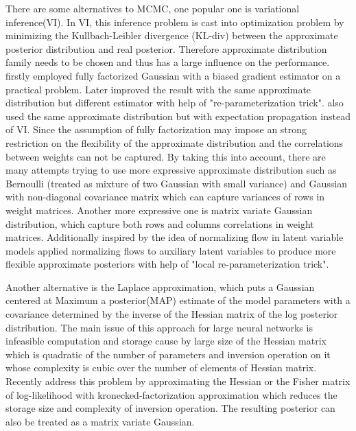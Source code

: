 There are some alternatives to MCMC, one popular one is variational inference(VI)\cite{hinton1993keeping}. In VI, this inference problem is cast into optimization problem by minimizing the Kullbach-Leibler divergence (KL-div) between the approximate posterior distribution and real posterior. Therefore approximate distribution family needs to be chosen and thus has a large influence on the performance. \cite{graves2011practical} firstly employed fully factorized Gaussian with a biased gradient estimator on a practical problem. Later \cite{blundell2015weight} improved the result with the same approximate distribution but different estimator with help of "re-parameterization trick"\cite{kingma2013auto}. \citealp{hernandez2015probabilistic} also used the same approximate distribution but with expectation propagation\cite{minka2001expectation} instead of VI.
Since the assumption of fully factorization may impose an strong restriction on the flexibility of the approximate distribution and the correlations between weights can not be captured. By taking this into account, there are many attempts trying to use more expressive approximate distribution such as Bernoulli (treated as mixture of two Gaussian with small variance)\cite{gal2016dropout} and Gaussian with non-diagonal covariance matrix \cite{kingma2015variational} which can capture variances of rows in weight matrices. Another more expressive one is matrix variate Gaussian distribution\cite{louizos2016structured}\cite{sun2017learning}\cite{zhang2017noisy}, which capture both rows and columns correlations in weight matrices. Additionally inspired by the idea of normalizing flow in latent variable models \cite{louizos2017multiplicative}applied normalizing flows to auxiliary latent variables to produce more flexible approximate posteriors with help of "local re-parameterization trick"\cite{kingma2015variational}. 


Another alternative is the Laplace approximation\cite{mackay1992practical}, which puts a Gaussian centered at Maximum a posterior(MAP) estimate of the model parameters with a covariance determined by the inverse of the Hessian matrix of the log posterior distribution. The main issue of this approach for large neural networks is infeasible computation and storage cause by large size of the Hessian matrix which is quadratic of the number of parameters and inversion operation on it whose complexity is cubic over the number of elements of Hessian matrix. Recently \cite{ritter2018scalable} address this problem by approximating the Hessian or the Fisher matrix of log-likelihood with kronecked-factorization approximation which reduces the storage size and complexity of inversion operation. The resulting posterior can also be treated as a matrix variate Gaussian.  

